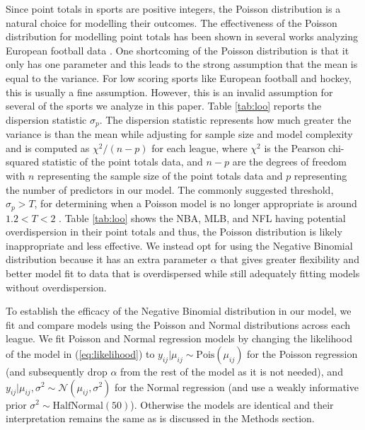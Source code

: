 Since point totals in sports are positive integers, the Poisson distribution is a natural choice for modelling their outcomes. The effectiveness of the Poisson distribution for modelling point totals has been shown in several works analyzing European football data \cite{Karlis2003} \cite{Baio2010} \cite{Benz2020}. One shortcoming of the Poisson distribution is that it only has one parameter and this leads to the strong assumption that the mean is equal to the variance. For low scoring sports like European football and hockey, this is usually a fine assumption. However, this is an invalid assumption for several of the sports we analyze in this paper. Table \ref{tab:loo} reports the dispersion statistic \(\sigma_p\). The dispersion statistic represents how much greater the variance is than the mean while adjusting for sample size and model complexity and is computed as  \(\chi^2/(n-p)\) for each league, where \(\chi^2\) is the Pearson chi-squared statistic of the point totals data, and \(n-p\) are the degrees of freedom with \(n\) representing the sample size of the point totals data and \(p\) representing the number of predictors in our model. The commonly suggested threshold, \(\sigma_p > T\), for determining when a Poisson model is no longer appropriate is around \(1.2 < T < 2\) \cite{Payne2018} \cite{Cameron1990}. Table \ref{tab:loo} shows the NBA, MLB, and NFL having potential overdispersion in their point totals and thus, the Poisson distribution is likely inappropriate and less effective. We instead opt for using the Negative Binomial distribution because it has an extra parameter \(\alpha\) that gives greater flexibility and better model fit to data that is overdispersed while still adequately fitting models without overdispersion.

To establish the efficacy of the Negative Binomial distribution in our model, we fit and compare models using the Poisson and Normal distributions across each league. We fit Poisson and Normal regression models by changing the likelihood of the model in (\ref{eq:likelihood}) to \(y_{ij} | \mu_{ij} \sim \text{Pois}(\mu_{ij})\) for the Poisson regression (and subsequently drop \(\alpha\) from the rest of the model as it is not needed), and \(y_{ij} | \mu_{ij}, \sigma^2 \sim \mathcal{N}(\mu_{ij}, \sigma^2)\) for the Normal regression (and use a weakly informative prior \(\sigma^2 \sim \text{HalfNormal}(50)\)). Otherwise the models are identical and their interpretation remains the same as is discussed in the Methods section.

